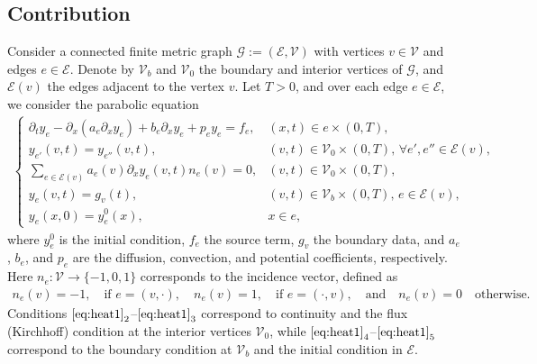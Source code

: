 \documentclass[10pt,a4paper]{amsart}
\def\to{\rightarrow}
\begin{document}
\subsection{Contribution} 
Consider a connected finite metric graph $\mathcal{G} := (\mathcal{E}, \mathcal{V})$ with vertices $v \in \mathcal{V}$ and edges $e \in \mathcal{E}$. Denote by $\mathcal{V}_b$ and $\mathcal{V}_0$ the boundary and interior vertices of $\mathcal{G}$, and $\mathcal{E}(v)$ the edges adjacent to the vertex $v$. Let $T > 0$, and over each edge $e \in \mathcal{E}$, we consider the parabolic equation
\begin{align}\label{eq:heat1}
\begin{cases}
\partial_t y_e - \partial_{x}(a_e\partial_x y_e)+ b_e\partial_x y_e +p_e y_e = f_e, & (x,t) \in e \times (0, T), \\
y_{e'}(v, t) = y_{e''}(v, t), & (v,t) \in \mathcal{V}_0\times(0,T),\,\forall e', e'' \in \mathcal{E}(v), \\
\sum_{e \in \mathcal{E}(v)}a_e(v) \partial_x y_e(v, t) n_e(v) = 0, & 
(v,t) \in \mathcal{V}_0\times(0,T),\\
y_e(v, t) = g_v(t), & (v,t) \in \mathcal{V}_b\times(0,T),\, e \in \mathcal{E}(v), \\
y_e(x, 0)= y_e^0(x), & x \in e,
\end{cases}
\end{align}
where $y_e^0$ is the initial condition, $f_e$ the source term, $g_v$ the boundary data, and $a_e$, $b_e$, and $p_e$ are the diffusion, convection, and potential coefficients, respectively. Here $n_e: \mathcal{V} \to \{-1, 0, 1\}$ corresponds to the incidence vector, defined as
\begin{align*}
    n_e(v)=-1, \quad \text {if } e=(v, \cdot), \quad n_e(v)=1, \quad \text {if } e=(\cdot, v), \quad \text {and} \quad n_e(v)=0 \quad \text {otherwise. }
\end{align*}
Conditions $\eqref{eq:heat1}_2$–$\eqref{eq:heat1}_3$ correspond to continuity and the flux (Kirchhoff) condition at the interior vertices $\mathcal{V}_0$, while $\eqref{eq:heat1}_4$–$\eqref{eq:heat1}_5$ correspond to the boundary condition at $\mathcal{V}_b$ and the initial condition in $\mathcal{E}$.
\end{document}
